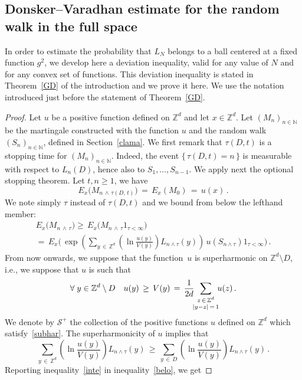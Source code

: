 \documentclass[AHL, Unicode, longabstracts, published]{cedram}
\newcommand{\tatop}[2]{\genfrac{}{}{0pt}{1}{#1}{#2}}
\newcommand*\Zd {{\mathbb Z^d}}
\newcommand*\N {{\mathbb N}}
\renewcommand{\N}{\mathbb{N}}
\let\oldforall\forall
\renewcommand*{\forall}{\mathrel{\oldforall}}
\begin{document}
\subsection{Donsker--Varadhan estimate for the random walk in the full space}\label{devi}
In order to estimate the probability that $L_N$ belongs to a ball centered at a fixed function $g^2$, we develop here a deviation inequality, valid for any value of $N$ and for any convex set of functions. This deviation inequality is stated in Theorem~\ref{GD} of the introduction and we prove it here. We use the notation introduced just before the statement of Theorem~\ref{GD}.

\begin{proof}
Let $u$ be a positive function defined on $\Zd$ and let $x\in\Zd$.
Let $(M_n)_{n\in\N}$ be the martingale constructed with the function $u$ and the random walk $(S_n)_{n\in \N}$, defined in Section~\ref{clama}. We first remark that ${\tau(D,t)}$ is a stopping time for $(M_n)_{n\in\N}$. Indeed, the event $\{\,\tau(D,t)=n\,\}$ is measurable with respect to $L_n(D)$, hence also to $S_1,\dots,S_{n-1}$. We apply next the optional stopping theorem. Let $t,n\geq 1$, we have
\[
E_x\big(
M_{n\,\wedge\,\tau(D,\,t)}\big)
\,=\,E_x(M_0)\,=\,u(x)\,.
\]
We note simply $\tau$ instead of $\tau(D,t)$ and we bound from below the lefthand member:
\begin{multline}\label{belo}
E_x\big(M_{n\,\wedge\,\tau}\big) \geq\, E_x\Big(M_{n\,\wedge\,\tau} 1_{\tau<\infty}
\Big)\\
=\, E_x\Bigg(
\,\exp\left(\sum_{y\,\in\,\Zd}\left(\ln
\frac{u(y)}{V(y)}\right)L_{n\wedge\tau}(y)\right)\, u(S_{n\wedge\tau}) 1_{\tau<\infty}
\Bigg)
\,.
\end{multline}
From now onwards, we suppose that the function~$u$ is superharmonic on $\Zd\setminus D$, i.e., we suppose that $u$ is such that
\begin{equation}\label{subhar}
\forall y\in\Zd\setminus D\quad{u(y)}
\,\geq\, {V(y)}
\,=\,
\frac{1}{2d}
\!\!\!
\sum_{\tatop{z\,\in\,\Zd}{|y-z|\,=\,1}}
\!\!\! u(z)\,.
\end{equation}
We denote by $\mathcal{S^+}$ the collection of the positive functions $u$ defined on $\Zd$ which satisfy~\eqref{subhar}. The superharmonicity of $u$ implies that
\begin{equation}\label{inte}
\sum_{y\,\in\,\Zd}\left(\ln
\frac{u(y)}{V(y)}\right)L_{n\wedge\tau}(y)
\,\geq\,
\sum_{y\,\in\,D}\left(\ln
\frac{u(y)}{V(y)}\right)L_{n\wedge\tau}(y)\,.
\end{equation}
Reporting inequality~\eqref{inte} in inequality~\eqref{belo}, we get

\end{proof}
\end{document}
